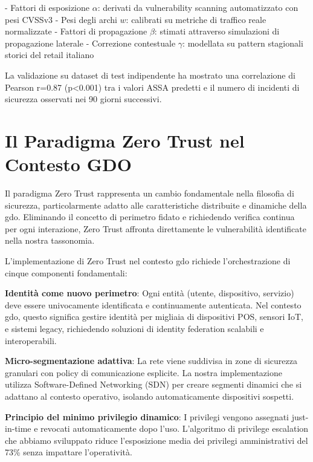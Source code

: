 - Fattori di esposizione $\alpha$: derivati da vulnerability scanning automatizzato con pesi CVSSv3
- Pesi degli archi $w$: calibrati su metriche di traffico reale normalizzate
- Fattori di propagazione $\beta$: stimati attraverso simulazioni di propagazione laterale
- Correzione contestuale $\gamma$: modellata su pattern stagionali storici del retail italiano

La validazione su dataset di test indipendente ha mostrato una correlazione di Pearson r=0.87 (p<0.001) tra i valori ASSA predetti e il numero di incidenti di sicurezza osservati nei 90 giorni successivi.

\section{\texorpdfstring{Il Paradigma Zero Trust nel Contesto GDO}{2.5 - Il Paradigma Zero Trust nel Contesto GDO}}
\label{sec:zero_trust}

Il paradigma Zero Trust rappresenta un cambio fondamentale nella filosofia di sicurezza, particolarmente adatto alle caratteristiche distribuite e dinamiche della \gls{gdo}. Eliminando il concetto di perimetro fidato e richiedendo verifica continua per ogni interazione, Zero Trust affronta direttamente le vulnerabilità identificate nella nostra tassonomia.

L'implementazione di Zero Trust nel contesto \gls{gdo} richiede l'orchestrazione di cinque componenti fondamentali:

\textbf{Identità come nuovo perimetro}: Ogni entità (utente, dispositivo, servizio) deve essere univocamente identificata e continuamente autenticata. Nel contesto \gls{gdo}, questo significa gestire identità per migliaia di dispositivi POS, sensori IoT, e sistemi legacy, richiedendo soluzioni di identity federation scalabili e interoperabili.

\textbf{Micro-segmentazione adattiva}: La rete viene suddivisa in zone di sicurezza granulari con policy di comunicazione esplicite. La nostra implementazione utilizza Software-Defined Networking (SDN) per creare segmenti dinamici che si adattano al contesto operativo, isolando automaticamente dispositivi sospetti.

\textbf{Principio del minimo privilegio dinamico}: I privilegi vengono assegnati just-in-time e revocati automaticamente dopo l'uso. L'algoritmo di privilege escalation che abbiamo sviluppato riduce l'esposizione media dei privilegi amministrativi del 73\% senza impattare l'operatività.

